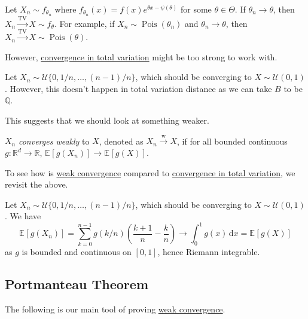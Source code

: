 \begin{eg}
	Let \(X_n \sim f_{\theta _n}\) where \(f_{\theta _n}(x) = f(x) e^{\theta x - \psi (\theta )}\) for some \(\theta \in \Theta \). If \(\theta _n \to \theta \), then \(X_n \overset{\operatorname{TV} }{\to } X \sim f_\theta \). For example, if \(X_n \sim \operatorname{Pois}(\theta _n) \) and \(\theta _n \to \theta \), then \(X_n \overset{\operatorname{TV} }{\to } X \sim \operatorname{Pois}(\theta ) \).
\end{eg}

However, \hyperref[def:convergence-in-total-variation]{convergence in total variation} might be too strong to work with.

\begin{eg}
	Let \(X_n \sim \mathcal{U} \{ 0, 1 / n, \dots , (n-1) / n \} \), which should be converging to \(X \sim \mathcal{U} (0, 1)\). However, this doesn't happen in total variation distance as we can take \(B\) to be \(\mathbb{Q} \).
\end{eg}

This suggests that we should look at something weaker.

\begin{definition}\label{def:weak-convergence}
	\(X_n \) \emph{converges weakly} to \(X\), denoted as \(X_n \overset{\text{w} }{\to } X\), if for all bounded continuous \(g \colon \mathbb{R} ^d \to \mathbb{R} \), \(\mathbb{E}_{}\left[g(X_n) \right] \to \mathbb{E}_{}\left[g(X) \right]\).
\end{definition}

To see how is \hyperref[def:weak-convergence]{weak convergence} compared to \hyperref[def:convergence-in-total-variation]{convergence in total variation}, we revisit the above.

\begin{eg}
	Let \(X_n \sim \mathcal{U} \{ 0, 1 / n, \dots , (n-1) / n \} \), which should be converging to \(X \sim \mathcal{U} (0, 1)\). We have
	\[
		\mathbb{E}_{}\left[g(X_n) \right]
		= \sum_{k=0}^{n-1} g(k / n) \left( \frac{k+1}{n} - \frac{k}{n} \right)
		\to \int_{0}^{1} g(x) \,\mathrm{d}x
		= \mathbb{E}_{}\left[g(X) \right]
	\]
	as \(g\) is bounded and continuous on \([0, 1]\), hence Riemann integrable.
\end{eg}

\subsection{Portmanteau Theorem}
The following is our main tool of proving \hyperref[def:weak-convergence]{weak convergence}.

